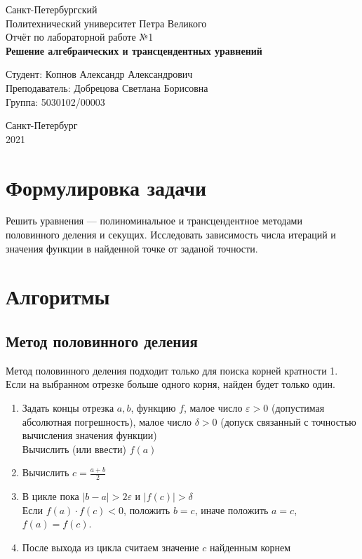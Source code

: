 \documentclass[a4paper]{article}
\let\epsilon\varepsilon
\begin{document}
\begin{titlepage}
  \Large
  \begin{center}
    Санкт-Петербургский\\
    Политехнический университет Петра Великого\\
    \vspace{10em}
    Отчёт по лабораторной работе №1\\
    \vspace{2em}
    \textbf{Решение алгебраических и трансцендентных уравнений}
  \end{center}
  \vspace{6em}
  \begin{flushright}
    Студент: Копнов Александр Александрович\\
    Преподаватель: Добрецова Светлана Борисовна\\
    Группа: 5030102/00003
  \end{flushright}
  \vspace{\fill}
  \begin{center}
    Санкт-Петербург\\
    2021
  \end{center}
\end{titlepage}
\tableofcontents
\pagebreak

\section{Формулировка задачи}
Решить уравнения --- полиноминальное и трансцендентное методами половинного деления и секущих. Исследовать зависимость числа итераций и значения функции в найденной точке от заданой точности.
\section{Алгоритмы}
\subsection{Метод половинного деления}
Метод половинного деления подходит только для поиска корней кратности 1. Если на выбранном отрезке больше одного корня, найден будет только один.
\begin{enumerate}
  \item Задать концы отрезка $a,b$, функцию $f$, малое число $\epsilon >0$ (допустимая абсолютная погрешность), малое число $\delta>0$ (допуск связанный с точностью вычисления значения функции)\\
        Вычислить (или ввести) $f(a)$
  \item Вычислить $c = \frac{a+b}{2}$
  \item В цикле пока $|b-a|>2\epsilon$ и $|f(c)|>\delta$\\
        Если $f(a)\cdot f(c) < 0$, положить $b = c$, иначе положить $a = c$, $f(a) = f(c)$.
  \item После выхода из цикла считаем значение $c$ найденным корнем
\end{enumerate}
\end{document}
